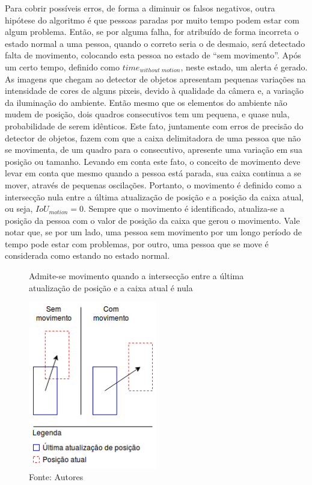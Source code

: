 \documentclass[]{politex}
\begin{document}
Para cobrir possíveis erros, de forma a diminuir os falsos negativos, outra hipótese do algoritmo é que pessoas paradas por muito tempo podem estar com algum problema. Então, se por alguma falha, for atribuído de forma incorreta o estado normal a uma pessoa, quando o correto seria o de desmaio, será detectado falta de movimento, colocando esta pessoa no estado de “sem movimento”. Após um certo tempo, definido como \(time_{without\;motion}\), neste estado, um alerta é gerado. As imagens que chegam ao detector de objetos apresentam pequenas variações na intensidade de cores de alguns pixeis, devido à qualidade da câmera e, a variação da iluminação do ambiente. Então mesmo que os elementos do ambiente não mudem de posição, dois quadros consecutivos tem um pequena, e quase nula, probabilidade de serem idênticos. Este fato, juntamente com erros de precisão do detector de objetos, fazem com que a caixa delimitadora de uma pessoa que não se movimenta, de um quadro para o consecutivo, apresente uma variação em sua posição ou tamanho. Levando em conta este fato, o conceito de movimento deve levar em conta que mesmo quando a pessoa está parada, sua caixa continua a se mover, através de pequenas oscilações. Portanto, o movimento é definido como a intersecção nula entre a última atualização de posição e a posição da caixa atual, ou seja, \(IoU_{motion}=0\). Sempre que o movimento é identificado, atualiza-se a posição da pessoa com o valor de posição da caixa que gerou o movimento. Vale notar que, se por um lado, uma pessoa sem movimento por um longo período de tempo pode estar com problemas, por outro, uma pessoa que se move é considerada como estando no estado normal.

\begin{figure}[H]
    \centering
    \caption{Admite-se movimento quando a intersecção entre a última atualização de posição e a caixa atual é nula}
    \includegraphics[width=0.5\textwidth]{Movimento}
    \caption*{Fonte: Autores}
    \label{fig:movimento}
\end{figure}
\end{document}
